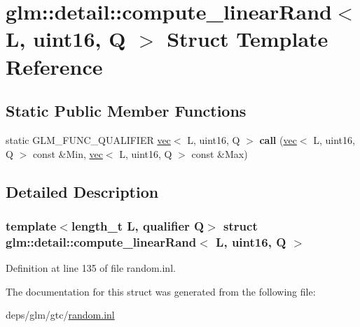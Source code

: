 \hypertarget{structglm_1_1detail_1_1compute__linearRand_3_01L_00_01uint16_00_01Q_01_4}{}\section{glm\+:\+:detail\+:\+:compute\+\_\+linear\+Rand$<$ L, uint16, Q $>$ Struct Template Reference}
\label{structglm_1_1detail_1_1compute__linearRand_3_01L_00_01uint16_00_01Q_01_4}
\subsection*{Static Public Member Functions}
\begin{DoxyCompactItemize}
\item 
\mbox{\label{structglm_1_1detail_1_1compute__linearRand_3_01L_00_01uint16_00_01Q_01_4_a26cd13e82c8f2dc14b2efd0a0f46c459}} 
static G\+L\+M\+\_\+\+F\+U\+N\+C\+\_\+\+Q\+U\+A\+L\+I\+F\+I\+ER \hyperlink{structglm_1_1vec}{vec}$<$ L, uint16, Q $>$ {\bfseries call} (\hyperlink{structglm_1_1vec}{vec}$<$ L, uint16, Q $>$ const \&Min, \hyperlink{structglm_1_1vec}{vec}$<$ L, uint16, Q $>$ const \&Max)
\end{DoxyCompactItemize}


\subsection{Detailed Description}
\subsubsection*{template$<$length\+\_\+t L, qualifier Q$>$\newline
struct glm\+::detail\+::compute\+\_\+linear\+Rand$<$ L, uint16, Q $>$}



Definition at line 135 of file random.\+inl.



The documentation for this struct was generated from the following file\+:\begin{DoxyCompactItemize}
\item 
deps/glm/gtc/\hyperlink{random_8inl}{random.\+inl}\end{DoxyCompactItemize}
